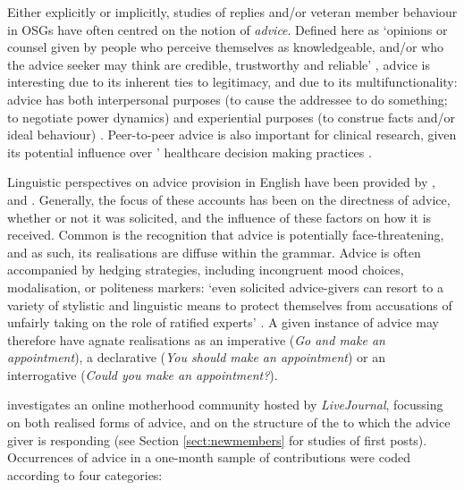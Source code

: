 Either explicitly or implicitly, studies of replies and\slash or veteran \gls{member} behaviour in \glspl{OSG} have often centred on the notion of \emph{advice}. Defined here as `opinions or counsel given by people who perceive themselves as knowledgeable, and\slash or who the advice seeker may think are credible, trustworthy and reliable' \cite[a definition taken from][p.~519]{decapua_strategies_1993}, advice is interesting due to its inherent ties to legitimacy, and due to its multifunctionality: advice has both interpersonal purposes (to cause the addressee to do something; to negotiate power dynamics) and experiential purposes (to construe facts and\slash or ideal behaviour) \cite{heritage_dilemmas_1992}. Peer\hyp{}to\hyp{}peer advice is also important for clinical research, given its potential influence over ' healthcare decision making practices \cite{jones_health_2013,sillence_giving_2013}.

Linguistic perspectives on advice provision in English have been provided by \textcite{hudson1990discourse}, \textcite{decapua_`if_1995} and \textcite{decapua_strategies_1993}. Generally, the focus of these accounts has been on the directness of advice, whether or not it was solicited, and the influence of these factors on how it is received. Common is the recognition that advice is potentially face\hyp{}threatening, and as such, its realisations are diffuse within the grammar. Advice is often accompanied by hedging strategies, including incongruent mood choices, modalisation, or politeness markers: `even solicited advice\hyp{}givers can resort to a variety of stylistic and linguistic means to protect themselves from accusations of unfairly taking on the role of ratified experts' \cite[p.~126]{decapua_`if_1995}. A given instance of advice may therefore have agnate realisations as an imperative (\emph{Go and make an appointment}), a declarative (\emph{You should make an appointment}) or an interrogative (\emph{Could you make an appointment?}).

\textcite{kouper_pragmatics_2010} investigates an online motherhood community hosted by \emph{LiveJournal}, focussing on both realised forms of advice, and on the structure of the  to which the advice giver is responding (see Section \ref{sect:newmembers} for studies of first \glspl{post}). Occurrences of advice in a one\hyp{}month sample of contributions were coded according to four categories: 


